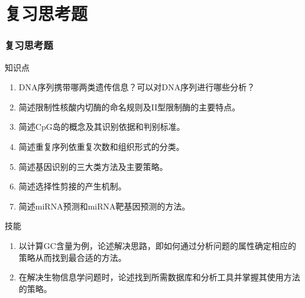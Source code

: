 \section{复习思考题}
\begin{frame}
  \frametitle{复习思考题}
  \begin{block}{知识点}
  \begin{enumerate}
    \item DNA序列携带哪两类遗传信息？可以对DNA序列进行哪些分析？
    \item 简述限制性核酸内切酶的命名规则及II型限制酶的主要特点。
    \item 简述CpG岛的概念及其识别依据和判别标准。
    \item 简述重复序列依重复次数和组织形式的分类。
    \item 简述基因识别的三大类方法及主要策略。
    \item 简述选择性剪接的产生机制。
    \item 简述miRNA预测和miRNA靶基因预测的方法。
  \end{enumerate}
\end{block}
\pause
\begin{block}{技能}
  \begin{enumerate}
    \item 以计算GC含量为例，论述解决思路，即如何通过分析问题的属性确定相应的策略从而找到最合适的方法。
    \item 在解决生物信息学问题时，论述找到所需数据库和分析工具并掌握其使用方法的策略。
  \end{enumerate}
\end{block}
\end{frame}

